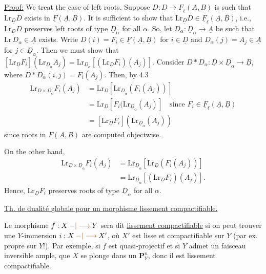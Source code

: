 \uline{Proof:} We treat the case of left roots. Suppose
$D:\underline{D}\longrightarrow\underline{F}_\ell(\underline{A},\underline{B})$ is such that $\mathrm{Lr}_{\underline{D}}D$ exists in $\underline{F}(\underline{A},\underline{B})$. It
is sufficient to show that $\mathrm{Lr}_{\underline{D}}D\in\underline{F}_\ell(\underline{A},\underline{B})$, i.e., $\mathrm{Lr}_{\underline{D}}D$
preserves left roots of type $\underline{D}_\alpha$ for all $\alpha$. So, let
$D_\alpha:\underline{D}_\alpha\longrightarrow\underline{A}$ be such that $\mathrm{Lr}\,D_\alpha\in\underline{A}$ exists. Write
$D(i)=F_i\in\underline{F}(\underline{A},\underline{B})$ for $i\in\underline{D}$ and $D_\alpha(j)=A_j\in\underline{A}$ for $j\in\underline{D}_\alpha$.
Then we must show that $[\mathrm{Lr}_{\underline{D}}F_i](\mathrm{Lr}_{\underline{D}_\alpha}A_j)=\mathrm{Lr}_{\underline{D}_\alpha}[(\mathrm{Lr}_{\underline{D}}F_i)(A_j)]$.
Consider $D*D_\alpha:\underline{D}\times\underline{D}_\alpha\longrightarrow\underline{B}$, where $D*D_\alpha(i,j)=F_i(A_j)$.
Then, by 4.3
\[
\begin{aligned}
\mathrm{Lr}_{\underline{D}\times\underline{D}_\alpha}F_i(A_j)
&=\mathrm{Lr}_{\underline{D}}[\mathrm{Lr}_{\underline{D}_\alpha}(F_i(A_j))]\\
&=\mathrm{Lr}_{\underline{D}}[F_i(\mathrm{Lr}_{\underline{D}_\alpha}(A_j)]
\quad\text{since }F_i\in\underline{F}_\ell(\underline{A},\underline{B})\\
&=[\mathrm{Lr}_{\underline{D}}F_i](\mathrm{Lr}_{\underline{D}_\alpha}(A_j))
\end{aligned}
\]
since roots in $\underline{F}(\underline{A},\underline{B})$ are computed objectwise.

On the other hand,
\[
\begin{aligned}
\mathrm{Lr}_{\underline{D}\times\underline{D}_\alpha}F_i(A_j)
&=\mathrm{Lr}_{\underline{D}_\alpha}[\mathrm{Lr}_{\underline{D}}(F_i(A_j))]\\
&=\mathrm{Lr}_{\underline{D}_\alpha}[(\mathrm{Lr}_{\underline{D}}F_i)(A_j)].
\end{aligned}
\]
Hence, $\mathrm{Lr}_{\underline{D}}F_i$ preserves roots of type $\underline{D}_\alpha$ for all $\alpha$.

\uline{Th. de dualité globale pour un morphisme lissement compactifiable.}

Le morphisme $f:X\mathbin{\unsure{-|\longrightarrow}}Y$ sera dit \uline{lissement compactifiable} si on peut trouver une $Y$-immersion $i:X\mathbin{\unsure{-|\longrightarrow}}X'$, où $X'$ est lisse et compactifiable sur $Y$ (par ex. propre sur $Y$!). Par exemple, si $f$ est quasi-projectif et si $Y$ admet un faisceau inversible ample,   que $X$ se plonge dans un $\mathbf P^n_Y$, donc il est lissement compactifiable.


